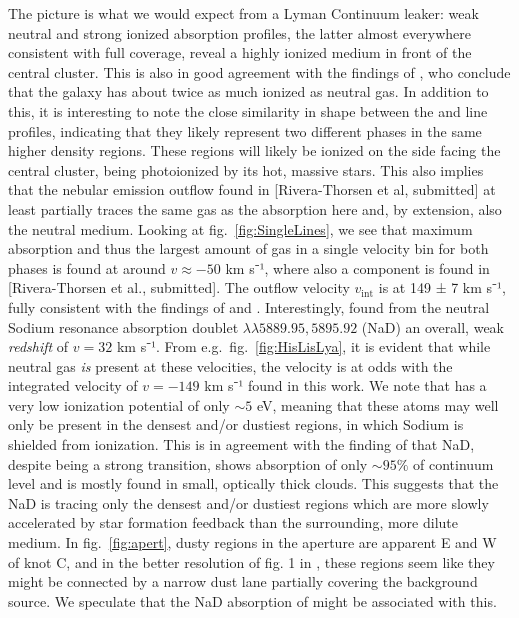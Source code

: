 \documentclass[twocolumn]{aastex61}
\begin{document}
The picture is what we would expect from a Lyman Continuum leaker: weak
neutral and strong ionized absorption profiles, the latter almost
everywhere consistent with full coverage, reveal a highly ionized medium
in front of the central cluster. This is also in good agreement with the
findings of \citet{Pardy2016arXiv}, who conclude that the galaxy has
about twice as much ionized as neutral gas. In addition to this, it is
interesting to note the close similarity in shape between the
 and  line profiles, indicating that they likely
represent two different phases in the same higher density regions. These
regions will likely be ionized on the side facing the central cluster,
being photoionized by its hot, massive stars. This also implies that the
nebular emission outflow found in {[}Rivera-Thorsen et al, submitted{]}
at least partially traces the same gas as the  absorption
here and, by extension, also the neutral medium. Looking at
fig.~\ref{fig:SingleLines}, we see that maximum absorption and thus the
largest amount of gas in a single velocity bin for both phases is found
at around $v \approx -50$ km s⁻¹, where also a component is found in
{[}Rivera-Thorsen et al., submitted{]}. The outflow velocity
$v_{\text{int}}$ is at 149 ± 7 km s⁻¹, fully consistent with the
findings of \citet{Heckman2015} and \citet{Alexandroff2015}.
Interestingly, \citet{Sandberg2013} found from the neutral Sodium
resonance absorption doublet $\lambda \lambda 5889.95,5895.92$ (NaD) an
overall, weak \emph{redshift} of $v = 32$ km s⁻¹. From
e.g.~fig.~\ref{fig:HisLisLya}, it is evident that while neutral gas
\emph{is} present at these velocities, the velocity is at odds with the
integrated velocity of $v = -149$ km s⁻¹ found in this work. We note
that  has a very low ionization potential of only $\sim 5$
eV, meaning that these atoms may well only be present in the densest
and/or dustiest regions, in which Sodium is shielded from ionization.
This is in agreement with the finding of \citet{Sandberg2013} that NaD,
despite being a strong transition, shows absorption of only $\sim 95\%$
of continuum level and is mostly found in small, optically thick clouds.
This suggests that the NaD is tracing only the densest and/or dustiest
regions which are more slowly accelerated by star formation feedback
than the surrounding, more dilute medium. In fig.~\ref{fig:apert}, dusty
regions in the aperture are apparent E and W of knot C, and in the
better resolution of fig. 1 in \citet{Adamo2010}, these regions seem
like they might be connected by a narrow dust lane partially covering
the background source. We speculate that the NaD absorption of
\citet{Sandberg2013} might be associated with this.
\end{document}

